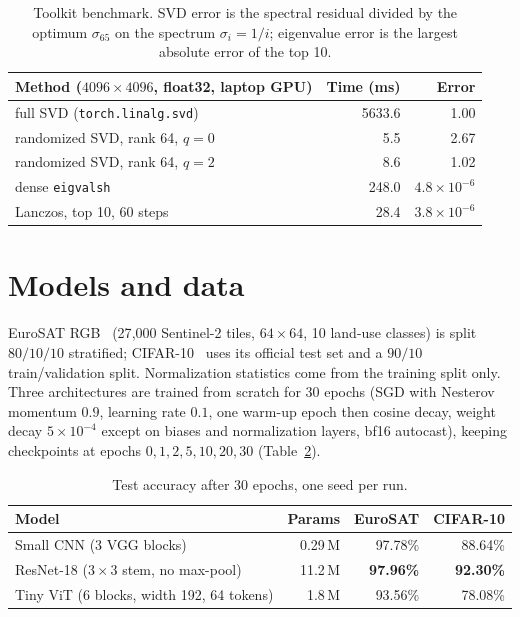 \documentclass[11pt]{article}
\theoremstyle{definition}
\begin{document}
\begin{table}[t]
\centering
\begin{tabular}{lrr}
\toprule
Method ($4096\times4096$, float32, laptop GPU) & Time (ms) & Error \\
\midrule
full SVD (\texttt{torch.linalg.svd}) & 5633.6 & 1.00 \\
randomized SVD, rank 64, $q=0$ & 5.5 & 2.67 \\
randomized SVD, rank 64, $q=2$ & 8.6 & 1.02 \\
dense \texttt{eigvalsh} & 248.0 & $4.8\times10^{-6}$ \\
Lanczos, top 10, 60 steps & 28.4 & $3.8\times10^{-6}$ \\
\bottomrule
\end{tabular}
\caption{Toolkit benchmark. SVD error is the spectral residual divided by the optimum
$\sigma_{65}$ on the spectrum $\sigma_i = 1/i$; eigenvalue error is the largest absolute error of the
top 10.}
\label{tab:linalg}
\end{table}

\section{Models and data}
\label{sec:setup}

EuroSAT RGB~\cite{helber2019} (27{,}000 Sentinel-2 tiles, $64\times64$, 10 land-use classes) is
split $80/10/10$ stratified; CIFAR-10~\cite{krizhevsky2009} uses its official test set and a
$90/10$ train/validation split. Normalization statistics come from the training split only.
Three architectures are trained from scratch for 30 epochs (SGD with Nesterov momentum $0.9$,
learning rate $0.1$, one warm-up epoch then cosine decay, weight decay $5\times10^{-4}$ except on
biases and normalization layers, bf16 autocast), keeping checkpoints at epochs
$0,1,2,5,10,20,30$ (Table~\ref{tab:train}).

\begin{table}[t]
\centering
\begin{tabular}{lrrr}
\toprule
Model & Params & EuroSAT & CIFAR-10 \\
\midrule
Small CNN (3 VGG blocks) & 0.29\,M & 97.78\% & 88.64\% \\
ResNet-18 ($3\times3$ stem, no max-pool) & 11.2\,M & \textbf{97.96\%} & \textbf{92.30\%} \\
Tiny ViT (6 blocks, width 192, 64 tokens) & 1.8\,M & 93.56\% & 78.08\% \\
\bottomrule
\end{tabular}
\caption{Test accuracy after 30 epochs, one seed per run.}
\label{tab:train}
\end{table}
\end{document}
